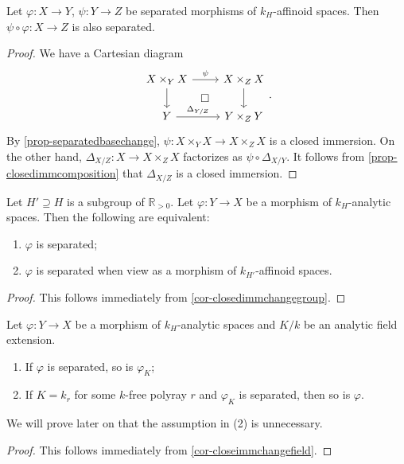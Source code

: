 \begin{proposition}
    Let $\varphi:X\rightarrow Y$, $\psi:Y\rightarrow Z$ be separated morphisms of $k_H$-affinoid spaces. Then $\psi \circ \varphi:X\rightarrow Z$ is also separated.
\end{proposition}
\begin{proof}
    We have a Cartesian diagram
    \[
        \begin{tikzcd}
            X\times_Y X \arrow[r,"\psi"] \arrow[d] \arrow[rd, "\square", phantom] & X\times_Z X\arrow[d] \\
            Y \arrow[r,"\Delta_{Y/Z}"]                                                    & Y\times_Z Y          
        \end{tikzcd}.
    \]
    By \cref{prop-separatedbasechange}, $\psi: X\times_Y X\rightarrow X\times_Z X$ is a closed immersion. On the other hand, $\Delta_{X/Z}:X\rightarrow X\times_Z X$ factorizes as $\psi\circ \Delta_{X/Y}$. It follows from \cref{prop-closedimmcomposition} that $\Delta_{X/Z}$ is a closed immersion.
\end{proof}

\iffalse
\begin{proposition}
    Let $\varphi:X\rightarrow Y$ and $\psi:Y\rightarrow Z$ be morphisms of $k_H$-analytic spaces. If $\psi\circ \varphi$ is separated, then so is $\varphi$.
\end{proposition}
\fi


\begin{proposition}
    Let $H'\supseteq H$ is a subgroup of $\mathbb{R}_{>0}$. Let $\varphi:Y\rightarrow X$ be a morphism of $k_H$-analytic spaces. Then the following are equivalent:
    \begin{enumerate}
        \item $\varphi$ is separated;
        \item $\varphi$ is separated when view as a morphism of $k_{H'}$-affinoid spaces.
    \end{enumerate}
\end{proposition}
\begin{proof}
    This follows immediately from \cref{cor-closedimmchangegroup}.
\end{proof}

\begin{proposition}
    Let $\varphi:Y\rightarrow X$ be a morphism of $k_H$-analytic spaces and $K/k$ be an analytic field extension. 
    \begin{enumerate}
        \item If $\varphi$ is separated, so is $\varphi_K$;
        \item If $K=k_r$ for some $k$-free polyray $r$ and $\varphi_K$ is separated, then so is $\varphi$.
    \end{enumerate}
\end{proposition}
We will prove later on that the assumption in (2) is unnecessary.
\begin{proof}
    This follows immediately from \cref{cor-closeimmchangefield}.
\end{proof}


